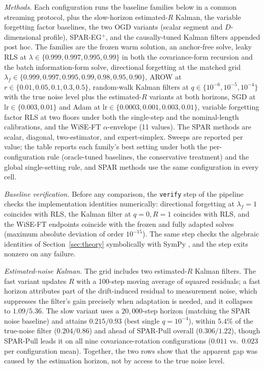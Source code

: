 \documentclass[11pt]{article}
\begin{document}
\emph{Methods.}
Each configuration runs the baseline families below in a common streaming protocol, plus the slow-horizon estimated-$R$ Kalman, the variable forgetting factor baselines, the two OGD variants (scalar segment and $D$-dimensional profile), SPAR-EG$^+$, and the causally-tuned Kalman filters appended post hoc. The families are the frozen warm solution, an anchor-free solve, leaky RLS at $\lambda \in \{0.999, 0.997, 0.995, 0.99\}$ in both the covariance-form recursion and the batch information-form solve, directional forgetting \citep{kulhavy1984,cao2000} at the matched grid $\lambda_f \in \{0.999, 0.997, 0.995, 0.99, 0.98, 0.95, 0.90\}$, AROW \citep{crammer2009arow} at $r \in \{0.01, 0.05, 0.1, 0.3, 0.5\}$, random-walk Kalman filters \citep{kalman1960,sayed1994} at $q \in \{10^{-6}, 10^{-5}, 10^{-4}\}$ with the true noise level plus the estimated-$R$ variants at both horizons, SGD at $\mathrm{lr} \in \{0.003, 0.01\}$ and Adam \citep{kingma2015adam} at $\mathrm{lr} \in \{0.0003, 0.001, 0.003, 0.01\}$, variable forgetting factor RLS at two floors under both the single-step and the nominal-length calibrations, and the WiSE-FT $\alpha$-envelope (11 values). The SPAR methods are scalar, diagonal, two-estimator, and expert-simplex.
Sweeps are reported per value; the table reports each family's best setting under both the per-configuration rule (oracle-tuned baselines, the conservative treatment) and the global single-setting rule, and SPAR methods use the same configuration in every cell.

\emph{Baseline verification.}
Before any comparison, the \texttt{verify} step of the pipeline checks the implementation identities numerically: directional forgetting at $\lambda_f = 1$ coincides with RLS, the Kalman filter at $q = 0, R = 1$ coincides with RLS, and the WiSE-FT endpoints coincide with the frozen and fully adapted solves (maximum absolute deviation of order $10^{-15}$).
The same step checks the algebraic identities of Section~\ref{sec:theory} symbolically with SymPy \citep{meurer2017sympy}, and the step exits nonzero on any failure.

\emph{Estimated-noise Kalman.}
The grid includes two estimated-$R$ Kalman filters.
The fast variant updates $R$ with a 100-step moving average of squared residuals; a fast horizon attributes part of the drift-induced residual to measurement noise, which suppresses the filter's gain precisely when adaptation is needed, and it collapses to $1.09/5.36$.
The slow variant uses a $20{,}000$-step horizon (matching the SPAR noise baseline) and attains $0.215/0.93$ (best single $q = 10^{-4}$), within $5.4\%$ of the true-noise filter ($0.204/0.86$) and ahead of SPAR-Pull overall ($0.306/1.22$), though SPAR-Pull leads it on all nine covariance-rotation configurations ($0.011$ vs.\ $0.023$ per configuration mean).
Together, the two rows show that the apparent gap was caused by the estimation horizon, not by access to the true noise level.
\end{document}
